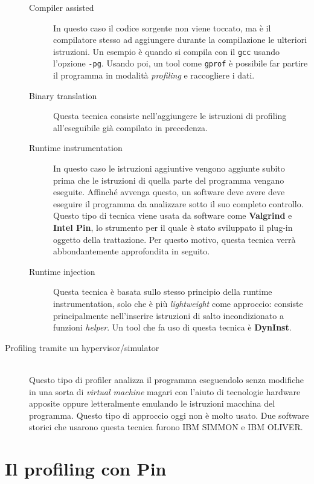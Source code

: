 \documentclass[a4paper,11pt]{report}
\begin{document}
\begin{description}
\begin{description}
\item[Compiler assisted]
In questo caso il codice sorgente non viene toccato, ma è il compilatore stesso ad aggiungere durante la compilazione le ulteriori istruzioni. Un esempio è quando si compila con il \verb|gcc| usando l'opzione \verb|-pg|. Usando poi, un tool come \verb|gprof| è possibile far partire il programma in modalità \textit{profiling} e raccogliere i dati.
\item[Binary translation]
Questa tecnica consiste nell'aggiungere le istruzioni di profiling all'eseguibile già compilato in precedenza.
\item[Runtime instrumentation]
In questo caso le istruzioni aggiuntive vengono aggiunte subito prima che le istruzioni di quella parte del programma vengano eseguite. Affinché avvenga questo, un software deve avere deve eseguire il programma da analizzare sotto il suo completo controllo. Questo tipo di tecnica viene usata da software come \textbf{Valgrind} e \textbf{Intel Pin}, lo strumento per il quale è stato sviluppato il plug-in oggetto della trattazione. Per questo motivo, questa tecnica verrà abbondantemente approfondita in seguito.
\item[Runtime injection]
Questa tecnica è basata sullo stesso principio della runtime instrumentation, solo che è più \textit{lightweight} come approccio: consiste principalmente nell'inserire istruzioni di salto incondizionato a funzioni \textit{helper}. Un tool che fa uso di questa tecnica è \textbf{DynInst}.
\end{description} 
\item[Profiling tramite un hypervisor/simulator] \hfill \\
Questo tipo di profiler analizza il programma eseguendolo senza modifiche in una sorta di \textit{virtual machine} magari con l'aiuto di tecnologie hardware apposite oppure letteralmente emulando le istruzioni macchina del programma. Questo tipo di approccio oggi non è molto usato. Due software storici che usarono questa tecnica furono IBM SIMMON e IBM OLIVER. 
\end{description}

\section{Il profiling con Pin}
\end{document}
